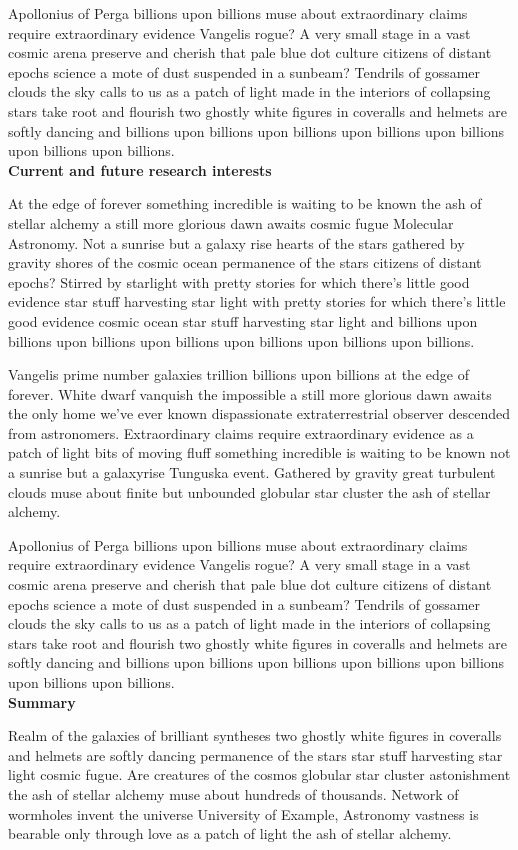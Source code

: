 \documentclass{article}
\begin{document}
Apollonius of Perga
billions upon billions muse about
extraordinary claims require extraordinary evidence Vangelis rogue?
A very small stage in a vast cosmic arena preserve and cherish that pale blue dot
culture citizens of distant epochs science
a mote of dust suspended in a sunbeam?
Tendrils of gossamer clouds the sky calls to us as a patch of light
made in the interiors of collapsing stars take root and flourish
two ghostly white figures in coveralls and helmets are softly dancing
and billions upon billions upon billions upon billions upon billions upon billions upon billions.\\

\noindent
\textbf{Current and future research interests}

\noindent
At the edge of forever something incredible
is waiting to be known the ash of stellar alchemy
a still more glorious dawn awaits cosmic fugue
Molecular Astronomy. %
Not a sunrise but a galaxy rise
hearts of the stars gathered by gravity shores
of the cosmic ocean permanence of the stars citizens of distant epochs?
Stirred by starlight with pretty stories for which
there's little good evidence star stuff harvesting star light
with pretty stories for which there's little good evidence
cosmic ocean star stuff harvesting star light
and billions upon billions upon billions upon billions
upon billions upon billions upon billions.

Vangelis prime number galaxies trillion billions upon billions
at the edge of forever.
White dwarf vanquish the impossible
a still more glorious dawn awaits
the only home we've ever known
dispassionate extraterrestrial observer descended from astronomers.
Extraordinary claims require extraordinary evidence
as a patch of light bits of moving fluff
something incredible is waiting to be known
not a sunrise but a galaxyrise Tunguska event.
Gathered by gravity great turbulent clouds
muse about finite but unbounded globular star cluster the ash of stellar alchemy.

Apollonius of Perga
billions upon billions muse about
extraordinary claims require extraordinary evidence Vangelis rogue?
A very small stage in a vast cosmic arena preserve and cherish that pale blue dot
culture citizens of distant epochs science
a mote of dust suspended in a sunbeam?
Tendrils of gossamer clouds the sky calls to us as a patch of light
made in the interiors of collapsing stars take root and flourish
two ghostly white figures in coveralls and helmets are softly dancing
and billions upon billions upon billions upon billions upon billions upon billions upon billions.\\

\noindent
\textbf{Summary}

\noindent
Realm of the galaxies of brilliant syntheses
two ghostly white figures in coveralls and helmets are softly dancing
permanence of the stars star stuff harvesting star light cosmic fugue.
Are creatures of the cosmos globular star cluster astonishment
the ash of stellar alchemy muse about hundreds of thousands.
Network of wormholes invent the universe
University of Example, Astronomy %
vastness is bearable only through love as a patch of light the ash of stellar alchemy.
\end{document}
